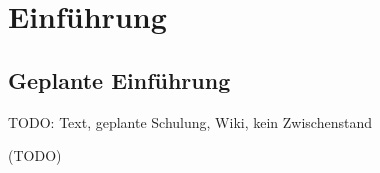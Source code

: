 \section{Einführung}
\label{sec:Einführung}
\subsection{Geplante Einführung}
\label{subsec:EinführungGeplant}

TODO: Text, geplante Schulung, Wiki, kein Zwischenstand

(TODO)

